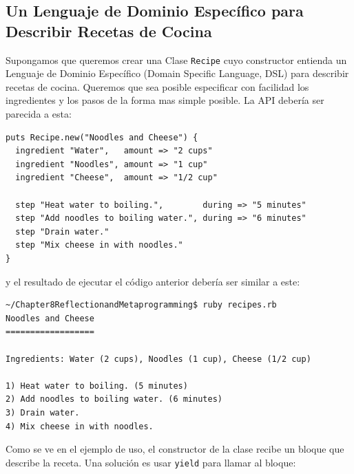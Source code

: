 \subsection{Un Lenguaje de Dominio Específico para Describir Recetas de Cocina}
\label{subsection:instanceeval}

Supongamos que queremos crear una Clase \verb|Recipe| cuyo constructor entienda 
un  Lenguaje de Dominio Específico (Domain Specific Language, DSL) para describir recetas
de cocina.
Queremos que sea posible especificar con facilidad  los ingredientes y los
pasos de la forma mas simple posible.
La API debería ser parecida a esta:

\begin{verbatim}
puts Recipe.new("Noodles and Cheese") {
  ingredient "Water",   amount => "2 cups"
  ingredient "Noodles", amount => "1 cup"
  ingredient "Cheese",  amount => "1/2 cup"

  step "Heat water to boiling.",        during => "5 minutes"
  step "Add noodles to boiling water.", during => "6 minutes"
  step "Drain water."
  step "Mix cheese in with noodles."
}
\end{verbatim}

y el resultado de ejecutar el código anterior debería ser similar a este:

\begin{verbatim}
~/Chapter8ReflectionandMetaprogramming$ ruby recipes.rb 
Noodles and Cheese
==================

Ingredients: Water (2 cups), Noodles (1 cup), Cheese (1/2 cup)

1) Heat water to boiling. (5 minutes)
2) Add noodles to boiling water. (6 minutes)
3) Drain water.
4) Mix cheese in with noodles.

\end{verbatim}

Como se ve en el ejemplo de uso, el constructor de la clase recibe un bloque que describe la receta.
Una solución es usar \verb|yield| para llamar al bloque:

